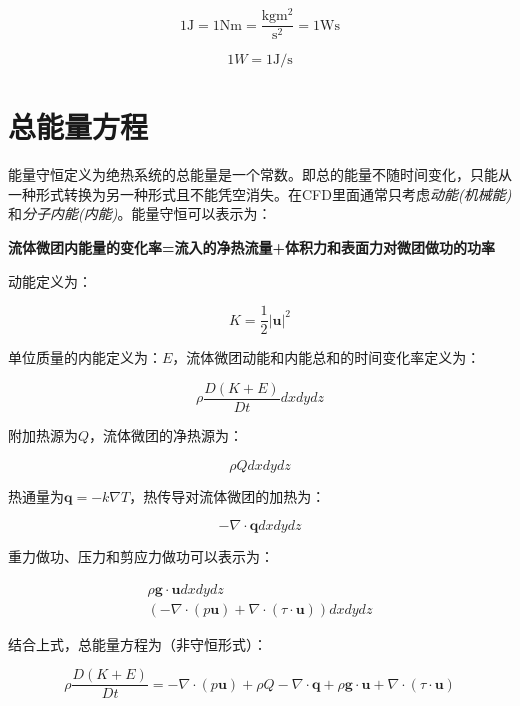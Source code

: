 \[1\si{\joule} = 1\si{\newton\meter} = \frac{\si{\kilogram\meter\squared}}{\si{\second\squared}} = 1\si{\watt\second} \]

\[1W = 1\si{\joule\per\second}\]

\section{总能量方程}
能量守恒定义为绝热系统的总能量是一个常数。即总的能量不随时间变化，只能从一种形式转换为另一种形式且不能凭空消失。在CFD里面通常只考虑\textit{动能(机械能)}和\textit{分子内能(内能)}。能量守恒可以表示为：

\begin{center}
\textbf{流体微团内能量的变化率=流入的净热流量+体积力和表面力对微团做功的功率}
\end{center}

动能定义为：

\begin{equation}
K=\frac{1}{2}|\mathbf{u}|^2
\end{equation}

单位质量的内能定义为：$ E $，流体微团动能和内能总和的时间变化率定义为：

\begin{equation}
\rho\frac{D(K+E)}{Dt}dxdydz
\end{equation}

附加热源为$ Q $，流体微团的净热源为：

\begin{equation}
\rho Qdxdydz
\end{equation}

热通量为$ \bm{q}=-k\nabla T $，热传导对流体微团的加热为：

\begin{equation}
-\nabla \cdot\bm{q}dxdydz
\end{equation}

重力做功、压力和剪应力做功可以表示为：

\begin{gather}
\rho\bm{g}\cdot\bm{u}dxdydz \\
(-\nabla\cdot(p\bm{u}) + \nabla\cdot(\tau\cdot\bm{u})) dxdydz
\end{gather}

结合上式，总能量方程为（非守恒形式）：

\begin{equation}
\rho\frac{D(K+E)}{Dt} =  -\nabla\cdot(p\bm{u}) + \rho Q - \nabla\cdot\bm{q} + \rho\bm{g}\cdot\bm{u} + \nabla\cdot(\tau\cdot\bm{u})
\end{equation}

